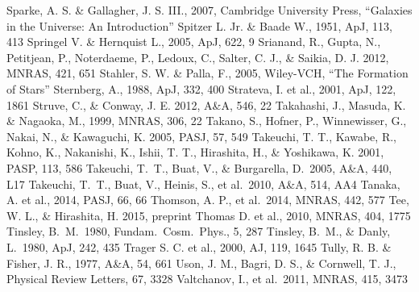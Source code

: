 \begin{thebibliography}{99}
\begin{multicols}{2}
{	Sparke, A. S. \& Gallagher, J. S. III., 2007, Cambridge University Press, 
	``Galaxies in the Universe: An Introduction''
	Spitzer L. Jr. \& Baade W., 1951, ApJ, 113, 413
	Springel V. \& Hernquist L., 2005, ApJ, 622, 9
    	Srianand, R., Gupta, N., Petitjean, P., Noterdaeme, P., Ledoux, C., Salter, C. J.,
    	\& Saikia, D. J. 2012, MNRAS, 421, 651
	Stahler, S. W. \& Palla, F., 2005, Wiley-VCH, ``The Formation of Stars''
      	Sternberg, A., 1988, ApJ, 332, 400
	Strateva, I. et al., 2001, ApJ, 122, 1861
    	Struve, C., \& Conway, J. E. 2012, A\&A, 546, 22
	Takahashi, J., Masuda, K. \& Nagaoka, M., 1999, MNRAS, 306, 22
    	Takano, S., Hofner, P., Winnewisser, G., Nakai, N., \& Kawaguchi, K.
    	2005, PASJ, 57, 549
    	Takeuchi, T. T., Kawabe, R., Kohno, K., Nakanishi, K., Ishii, T. T., Hirashita, H.,
    	\& Yoshikawa, K. 2001, PASP, 113, 586
	Takeuchi, T.~T., Buat, V., \& Burgarella, D.\ 2005, A\&A, 440, L17 
	Takeuchi, T.~T., Buat, V., Heinis, S., et al.\ 2010, A\&A, 514, AA4 
	Tanaka, A. et al., 2014, PASJ, 66, 66
    	Thomson, A. P., et al.\ 2014, MNRAS, 442, 577
   	Tee, W. L., \& Hirashita, H. 2015, preprint
	Thomas D. et al., 2010, MNRAS, 404, 1775
	Tinsley, B.~M.\ 1980, Fundam.\ Cosm.\ Phys., 5, 287 
	Tinsley, B.~M., \& Danly, L.\ 1980, ApJ, 242, 435 
	Trager S. C. et al., 2000, AJ, 119, 1645
	Tully, R. B. \& Fisher, J. R., 1977, A\&A, 54, 661
    	Uson, J. M., Bagri, D. S., \& Cornwell, T. J., Physical Review Letters, 67, 3328
    	Valtchanov, I., et al.\ 2011, MNRAS, 415, 3473
}
\end{multicols}
\end{thebibliography}
